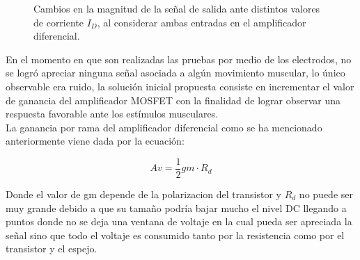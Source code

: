\begin{figure}[H]

\centering


\caption{Cambios en la magnitud de la señal de salida ante distintos valores de corriente $I_D$, al considerar ambas entradas en el amplificador diferencial.}
\label{salida-diferencial-mosfet-resistencia}

\end{figure}

En el momento en que son realizadas las pruebas por medio de los electrodos, no se logró apreciar ninguna señal asociada a algún movimiento muscular, lo único observable era ruido, la solución inicial propuesta consiste en incrementar el valor de ganancia del amplificador MOSFET con la finalidad de lograr observar una respuesta favorable ante los estímulos musculares.\\

La ganancia por rama del amplificador diferencial como se ha mencionado anteriormente viene dada por la ecuación:

\begin{equation}
Av=\frac{1}{2}gm\cdot R_d
\end{equation}

Donde el valor de gm depende de la polarizacion del transistor y $R_d$ no puede ser muy grande debido a que su tamaño podría bajar mucho el nivel DC llegando a puntos donde no se deja una ventana de voltaje en la cual pueda ser apreciada la señal sino que todo el voltaje es consumido tanto por la resistencia como por el transistor y el espejo.

